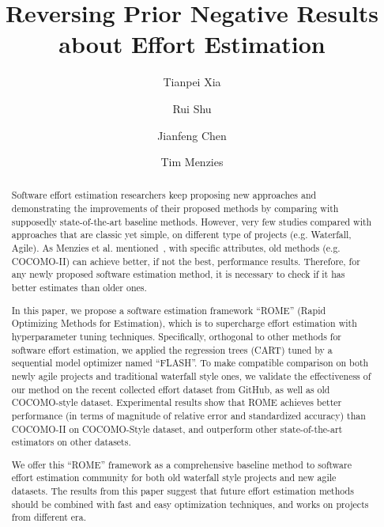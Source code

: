 \documentclass[sigconf,review]{acmart}
\begin{document}
\title{Reversing Prior Negative Results about Effort Estimation}

\author{Tianpei Xia}

\author{Rui Shu}

\author{Jianfeng Chen}

\author{Tim Menzies}

\renewcommand{\shortauthors}{Xia et al.}
\renewcommand{\textrightarrow}{$\rightarrow$}


\begin{abstract}
Software effort estimation researchers keep proposing new approaches and  demonstrating the improvements of their proposed methods by comparing with supposedly state-of-the-art baseline methods. However, very few studies compared with approaches that are classic yet simple, on different type of projects (e.g. Waterfall, Agile). As Menzies et al. mentioned~\cite{MenziesNeg:2017}, with specific attributes, old methods (e.g. COCOMO-II) can achieve better, if not the best, performance results. Therefore, for any newly proposed software estimation method, it is necessary to check if it has better estimates than older ones.
 
In this paper, we propose a software estimation framework ``ROME'' (Rapid Optimizing Methods for Estimation), which is to supercharge effort estimation with hyperparameter tuning techniques. Specifically, orthogonal to other methods for software effort estimation, we applied the regression trees (CART) tuned by a sequential model optimizer named ``FLASH''. To make compatible comparison on both newly agile projects and traditional waterfall style ones, we validate the effectiveness of our method on the recent collected effort dataset from GitHub, as well as old COCOMO-style dataset. Experimental results show that ROME achieves better performance (in terms of magnitude of relative error and standardized accuracy) than COCOMO-II on COCOMO-Style dataset, and outperform other state-of-the-art estimators on other datasets. 

We offer this ``ROME'' framework as a comprehensive baseline method to software effort estimation community for both old waterfall style projects and new agile datasets. The results from this paper suggest that future effort estimation methods should be combined with fast and easy optimization techniques, and works on projects from different era.
\end{abstract}
\end{document}
